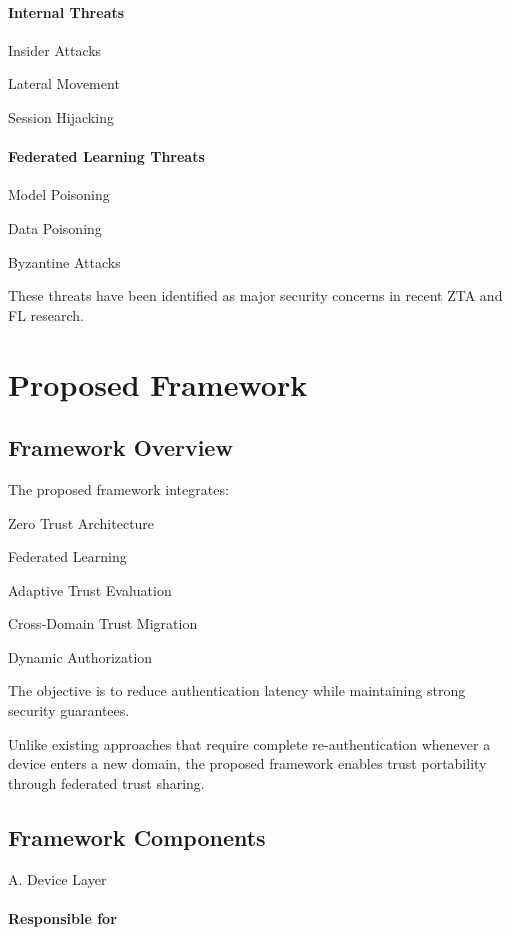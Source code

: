 \paragraph{Internal Threats}

Insider Attacks


Lateral Movement


Session Hijacking


\paragraph{Federated Learning Threats}

Model Poisoning


Data Poisoning


Byzantine Attacks


These threats have been identified as major security concerns in recent ZTA and FL research.


\section{Proposed Framework}

\subsection{Framework Overview}

The proposed framework integrates:


Zero Trust Architecture


Federated Learning


Adaptive Trust Evaluation


Cross-Domain Trust Migration


Dynamic Authorization


The objective is to reduce authentication latency while maintaining strong security guarantees.


Unlike existing approaches that require complete re-authentication whenever a device enters a new domain, the proposed framework enables trust portability through federated trust sharing.


\subsection{Framework Components}

A. Device Layer


\paragraph{Responsible for}

